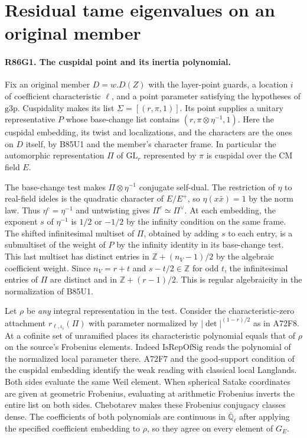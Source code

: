 \section{Residual tame eigenvalues on an original member}

\paragraph{R86G1. The cuspidal point and its inertia polynomial.}
Fix an original member $D=w.D(Z)$ with the layer-point guards, a location
$i$ of coefficient characteristic $\ell$, and a point parameter satisfying
the hypotheses of $\mathrm{g3p}$. Cuspidality makes its list
$\Sigma=[(r,\pi,1)]$. Its point supplies a unitary representative $P$ whose
base-change list contains $(r,\pi\otimes\eta^{-1},1)$. Here the cuspidal
embedding, its twist and localizations, and the characters are the ones
on $D$ itself, by B85U1 and the member's character frame.
In particular the automorphic representation $\Pi$ of $\mathrm{GL}_r$
represented by $\pi$ is cuspidal over the CM field $E$.

The base-change test makes $\Pi\otimes\eta^{-1}$ conjugate self-dual.
The restriction of $\eta$ to real-field ideles is the quadratic
character of $E/E^+$, so $\eta(x\bar x)=1$ by the norm law. Thus
$\eta^c=\eta^{-1}$ and untwisting gives $\Pi^c\simeq\Pi^\vee$.
At each embedding, the exponent $s$ of $\eta^{-1}$ is $1/2$ or
$-1/2$ by the infinity condition on the same frame. The shifted
infinitesimal multiset of $\Pi$, obtained by adding $s$ to each entry,
is a submultiset of the weight of $P$ by the infinity identity in
its base-change test. This last multiset has distinct entries in
$\mathbb Z+(n_V-1)/2$ by the algebraic coefficient weight.
Since $n_V=r+t$ and $s-t/2\in\mathbb Z$ for odd $t$, the
infinitesimal entries of $\Pi$ are distinct and in
$\mathbb Z+(r-1)/2$. This is regular algebraicity in the
normalization of B85U1.

Let $\rho$ be \emph{any} integral representation in the test.
Consider the characteristic-zero attachment $r_{\ell,\iota_i}(\Pi)$
with parameter normalized by $|\det|^{(1-r)/2}$ as in A72F8.
At a cofinite set of unramified places its characteristic polynomial
equals that of $\rho$ on the source's Frobenius elements.
Indeed $\mathrm{IsRepOfSig}$ reads the polynomial of the normalized
local parameter there. A72F7 and the good-support condition of the
cuspidal embedding identify the weak reading with classical local
Langlands. Both sides evaluate the same Weil element. When spherical
Satake coordinates are given at geometric Frobenius, evaluating at
arithmetic Frobenius inverts the entire list on both sides.
Chebotarev makes these Frobenius conjugacy classes dense. The
coefficients of both polynomials are continuous in
$\overline{\mathbb Q}_\ell$ after applying the specified coefficient
embedding to $\rho$, so they agree on every element of $G_E$.

